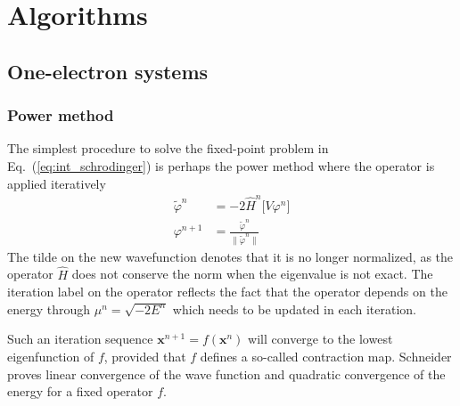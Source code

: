 \chapter{Algorithms}
\section{One-electron systems}
\subsection{Power method}
The simplest procedure to solve the fixed-point problem in Eq.~(\ref{eq:int_schrodinger}) 
is perhaps the power method where the operator is applied iteratively
\begin{align}
    \label{eq:power_iter}
    \tilde{\varphi}^{n} &= -2 \hat{H}^n\big[V\varphi^{n}\big]\\
    \varphi^{n+1} &= \frac{\tilde{\varphi}^{n}}{\|\tilde{\varphi}^{n}\|}
\end{align}
The tilde on the new wavefunction denotes that it is no longer normalized, 
as the operator $\hat{H}$ does not conserve the norm when the eigenvalue 
is not exact.\cite{Kalos} The iteration label on the operator reflects the 
fact that the operator depends on the energy through $\mu^n = \sqrt{-2E^n}$ 
which needs to be updated in each iteration.

Such an iteration sequence $\boldsymbol{x}^{n+1} = f(\boldsymbol{x}^n)$
will converge to the lowest eigenfunction of $f$, provided that $f$ defines
a so-called contraction map. Schneider\cite{Schneider} proves linear convergence
of the wave function and quadratic convergence of the energy for a fixed operator
$f$. 

